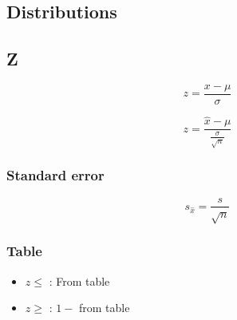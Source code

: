 \documentclass[letterpaper]{article}
\newcommand{\divline}{\noindent\makebox[\linewidth]{\rule{\textwidth}{0.4pt}}}
\begin{document}
    \divline
    \begin{multicols}{2}
        \section{Distributions}

        \subsection{Z}

        \[z = \frac{x - \mu}{\sigma}\]

        \[z = \frac{\hat{x} - \mu}{\frac{\sigma}{\sqrt{n}}}\]

        \subsubsection{Standard error}

        \[s_{\hat{x}}  = \frac{s}{\sqrt{n}}\]

        \subsubsection{Table}

        \begin{itemize}
            \item \(z \leq \) : From table
            \item \(z \geq \) : \(1 -\) from table
        \end{itemize}

        

        
    \end{multicols}
\end{document}
